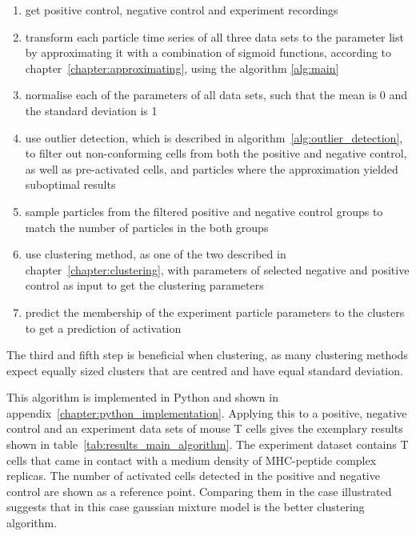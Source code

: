\begin{enumerate}
	\item get positive control, negative control and experiment recordings
	\item transform each particle time series of all three data sets to the parameter list by approximating it with a combination of sigmoid functions, according to chapter~\ref{chapter:approximating}, using the algorithm \ref{alg:main}
	\item normalise each of the parameters of all data sets, such that the mean is 0 and the standard deviation is 1
	\item use outlier detection, which is described in algorithm~\ref{alg:outlier_detection}, to filter out non-conforming cells from both the positive and negative control, as well as pre-activated cells, and particles where the approximation yielded suboptimal results
	\item sample particles from the filtered positive and negative control groups to match the number of particles in the both groups
	\item use clustering method, as one of the two described in chapter~\ref{chapter:clustering}, with parameters of selected negative and positive control as input to get the clustering parameters
	\item predict the membership of the experiment particle parameters to the clusters to get a prediction of activation
\end{enumerate}

The third and fifth step is beneficial when clustering, as many clustering methods expect equally sized clusters that are centred and have equal standard deviation. 

This algorithm is implemented in Python and shown in appendix~\ref{chapter:python_implementation}. Applying this to a positive, negative control and an experiment data sets of mouse T cells gives the exemplary results shown in table~\ref{tab:results_main_algorithm}. The experiment dataset contains T cells that came in contact with a medium density of MHC-peptide complex replicas. The number of activated cells detected in the positive and negative control are shown as a reference point. Comparing them in the case illustrated suggests that in this case gaussian mixture model is the better clustering algorithm.

